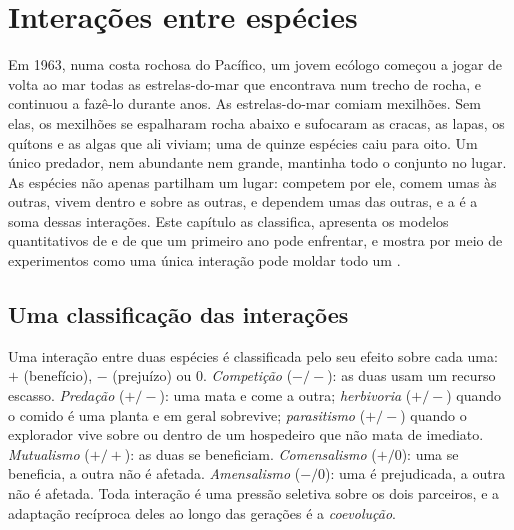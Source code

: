 \chapter{Interações entre espécies}\label{ch:b1:species-interactions}

Em 1963, numa costa rochosa do Pacífico, um jovem ecólogo começou a
jogar de volta ao mar todas as estrelas-do-mar que encontrava num
trecho de rocha, e continuou a fazê-lo durante anos. As
estrelas-do-mar comiam mexilhões. Sem elas, os mexilhões se
espalharam rocha abaixo e sufocaram as cracas, as lapas, os quítons e
as algas que ali viviam; uma  de quinze espécies caiu para
oito. Um único predador, nem abundante nem grande, mantinha todo o
conjunto no lugar. As espécies não apenas partilham um lugar: competem
por ele, comem umas às outras, vivem dentro e sobre as outras, e
dependem umas das outras, e a  é a soma dessas interações.
Este capítulo as classifica, apresenta os modelos quantitativos de
 e de  que um primeiro ano pode enfrentar, e mostra
por meio de experimentos como uma única interação pode moldar todo um
.

\section{Uma classificação das interações}

\begin{definition}\label{def:b1:species-interactions:types}
Uma interação entre duas espécies é classificada pelo seu efeito sobre
cada uma: $+$ (benefício), $-$ (prejuízo) ou $0$. \emph{Competição}
($-/-$): as duas usam um recurso escasso. \emph{Predação} ($+/-$): uma
mata e come a outra; \emph{herbivoria} ($+/-$) quando o comido é uma
planta e em geral sobrevive; \emph{parasitismo} ($+/-$) quando o
explorador vive sobre ou dentro de um hospedeiro que não mata de
imediato. \emph{Mutualismo} ($+/+$): as duas se beneficiam.
\emph{Comensalismo} ($+/0$): uma se beneficia, a outra não é afetada.
\emph{Amensalismo} ($-/0$): uma é prejudicada, a outra não é afetada.
Toda interação é uma pressão seletiva sobre os dois parceiros, e a
adaptação recíproca deles ao longo das gerações é a \emph{coevolução}.
\end{definition}

